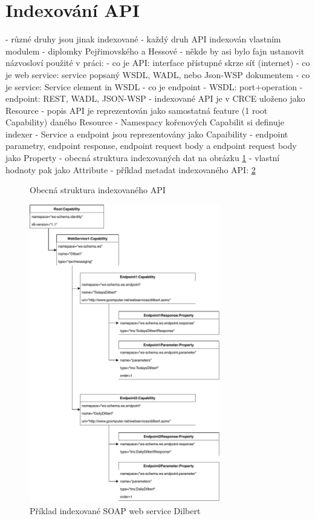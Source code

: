 \documentclass[czech,DP]{thesiskiv}
\begin{document}
\section{Indexování API}

- různé druhy jsou jinak indexované
- každý druh API indexován vlastním modulem - diplomky Pejřimovského \cite{pejrimovsky2015ws} a Hessové \cite{hessova2015rest}
- někde by asi bylo fajn ustanovit názvosloví použité v práci:
	- co je API: interface přístupné skrze síť (internet)
	- co je web service: service popsaný WSDL, WADL, nebo Json-WSP dokumentem
	- co je service: Service element in WSDL
	- co je endpoint
		- WSDL: port+operation
		- endpoint: REST, WADL, JSON-WSP
- indexované API je v CRCE uloženo jako Resource		
- popis API je reprezentován jako samostatná feature (1 root Capability) daného Resource
	- Namespacy kořenových Capabilit si definuje indexer
- Service a endpoint jsou reprezentovány jako Capaibility
- endpoint parametry, endpoint response, endpoint request body a endpoint request body jako Property
	- obecná struktura indexovaných dat na obrázku \ref{fig:indexed-api-general}
- vlastní hodnoty pak jako Attribute
- příklad metadat indexovaného API: \ref{fig:indexed-api-example}

\begin{figure}[h]
	\centering
	\caption{Obecná struktura indexovaného API}
	\label{fig:indexed-api-general}
\end{figure}

 \begin{figure}[h]
	\centering
	\includegraphics[height=13cm]{indexed-api-example}
	\caption{Příklad indexované SOAP web service Dilbert }
	\label{fig:indexed-api-example}
\end{figure}
\end{document}
